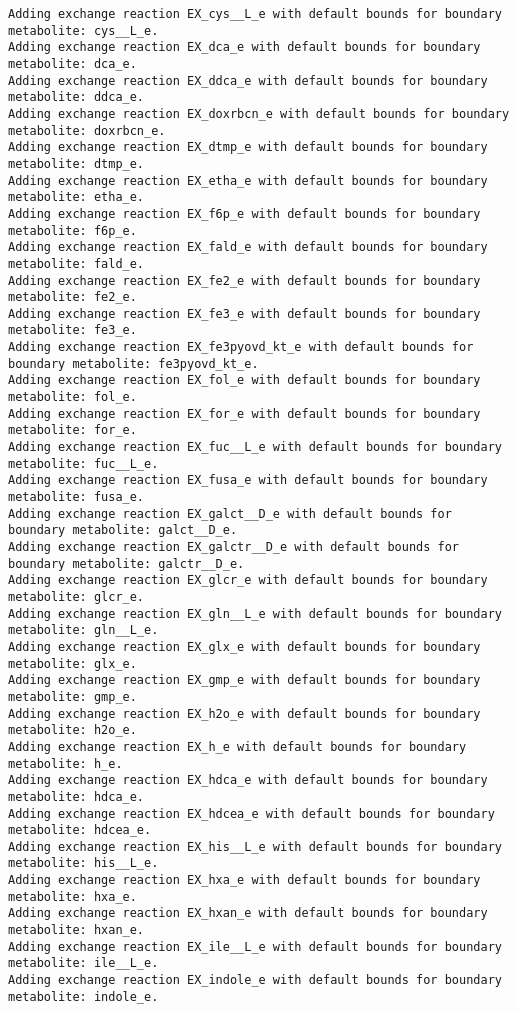 \documentclass[
  letterpaper,
  DIV=11,
  numbers=noendperiod]{scrartcl}
\begin{document}
\begin{verbatim}
Adding exchange reaction EX_cys__L_e with default bounds for boundary metabolite: cys__L_e.
Adding exchange reaction EX_dca_e with default bounds for boundary metabolite: dca_e.
Adding exchange reaction EX_ddca_e with default bounds for boundary metabolite: ddca_e.
Adding exchange reaction EX_doxrbcn_e with default bounds for boundary metabolite: doxrbcn_e.
Adding exchange reaction EX_dtmp_e with default bounds for boundary metabolite: dtmp_e.
Adding exchange reaction EX_etha_e with default bounds for boundary metabolite: etha_e.
Adding exchange reaction EX_f6p_e with default bounds for boundary metabolite: f6p_e.
Adding exchange reaction EX_fald_e with default bounds for boundary metabolite: fald_e.
Adding exchange reaction EX_fe2_e with default bounds for boundary metabolite: fe2_e.
Adding exchange reaction EX_fe3_e with default bounds for boundary metabolite: fe3_e.
Adding exchange reaction EX_fe3pyovd_kt_e with default bounds for boundary metabolite: fe3pyovd_kt_e.
Adding exchange reaction EX_fol_e with default bounds for boundary metabolite: fol_e.
Adding exchange reaction EX_for_e with default bounds for boundary metabolite: for_e.
Adding exchange reaction EX_fuc__L_e with default bounds for boundary metabolite: fuc__L_e.
Adding exchange reaction EX_fusa_e with default bounds for boundary metabolite: fusa_e.
Adding exchange reaction EX_galct__D_e with default bounds for boundary metabolite: galct__D_e.
Adding exchange reaction EX_galctr__D_e with default bounds for boundary metabolite: galctr__D_e.
Adding exchange reaction EX_glcr_e with default bounds for boundary metabolite: glcr_e.
Adding exchange reaction EX_gln__L_e with default bounds for boundary metabolite: gln__L_e.
Adding exchange reaction EX_glx_e with default bounds for boundary metabolite: glx_e.
Adding exchange reaction EX_gmp_e with default bounds for boundary metabolite: gmp_e.
Adding exchange reaction EX_h2o_e with default bounds for boundary metabolite: h2o_e.
Adding exchange reaction EX_h_e with default bounds for boundary metabolite: h_e.
Adding exchange reaction EX_hdca_e with default bounds for boundary metabolite: hdca_e.
Adding exchange reaction EX_hdcea_e with default bounds for boundary metabolite: hdcea_e.
Adding exchange reaction EX_his__L_e with default bounds for boundary metabolite: his__L_e.
Adding exchange reaction EX_hxa_e with default bounds for boundary metabolite: hxa_e.
Adding exchange reaction EX_hxan_e with default bounds for boundary metabolite: hxan_e.
Adding exchange reaction EX_ile__L_e with default bounds for boundary metabolite: ile__L_e.
Adding exchange reaction EX_indole_e with default bounds for boundary metabolite: indole_e.

\end{verbatim}
\end{document}
